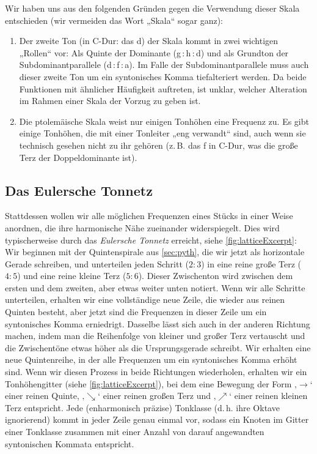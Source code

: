 Wir haben uns aus den folgenden Gründen gegen die Verwendung dieser Skala
entschieden (wir vermeiden das Wort „Skala“ sogar ganz):
\begin{enumerate}
\item Der zweite Ton (in C-Dur: das d) der Skala kommt in zwei wichtigen
  „Rollen“ vor: Als Quinte der Dominante (g\,:\,h\,:\,d) und als Grundton der
  Subdominantparallele (d\,:\,f\,:\,a). Im Falle der Subdominantparallele muss auch
  dieser zweite Ton um ein syntonisches Komma tiefalteriert werden. Da beide
  Funktionen mit ähnlicher Häufigkeit auftreten, ist unklar, welcher Alteration
  im Rahmen einer Skala der Vorzug zu geben ist.
\item Die ptolemäische Skala weist nur einigen Tonhöhen eine Frequenz zu. Es
  gibt einige Tonhöhen, die mit einer Tonleiter „eng verwandt“ sind, auch wenn
  sie technisch gesehen nicht zu ihr gehören (z.\,B. das \sharp f in C-Dur, was
  die große Terz der Doppeldominante ist).
\end{enumerate}

\subsection{Das Eulersche Tonnetz}

Stattdessen wollen wir alle möglichen Frequenzen eines Stücks in einer Weise
anordnen, die ihre harmonische Nähe zueinander widerspiegelt. Dies wird
typischerweise durch das \emph{Eulersche Tonnetz} erreicht, siehe
\cref{fig:latticeExcerpt}: Wir beginnen mit der Quintenspirale aus
\cref{sec:pyth}, die wir jetzt als horizontale Gerade schreiben, und unterteilen
jeden Schritt ($2:3$) in eine reine große Terz ($4:5$) und eine reine kleine
Terz ($5:6$). Dieser Zwischenton wird zwischen dem ersten und dem zweiten, aber
etwas weiter unten notiert. Wenn wir alle Schritte unterteilen, erhalten wir
eine vollständige neue Zeile, die wieder aus reinen Quinten besteht, aber jetzt
sind die Frequenzen in dieser Zeile um ein syntonisches Komma
erniedrigt. Dasselbe lässt sich auch in der anderen Richtung machen, indem man
die Reihenfolge von kleiner und großer Terz vertauscht und die Zwischentöne
etwas höher als die Ursprungsgerade schreibt. Wir erhalten eine neue
Quintenreihe, in der alle Frequenzen um ein syntonisches Komma erhöht sind. Wenn
wir diesen Prozess in beide Richtungen wiederholen, erhalten wir ein
Tonhöhengitter (siehe \cref{fig:latticeExcerpt}), bei dem eine Bewegung der Form
‚$\to$‘ einer reinen Quinte, ‚$\searrow$‘ einer reinen großen Terz und
‚$\nearrow$‘ einer reinen kleinen Terz entspricht. Jede (enharmonisch präzise)
Tonklasse (d.\,h. ihre Oktave ignorierend) kommt in jeder Zeile genau einmal
vor, sodass ein Knoten im Gitter einer Tonklasse zusammen mit einer Anzahl von
darauf angewandten syntonischen Kommata entspricht.%


